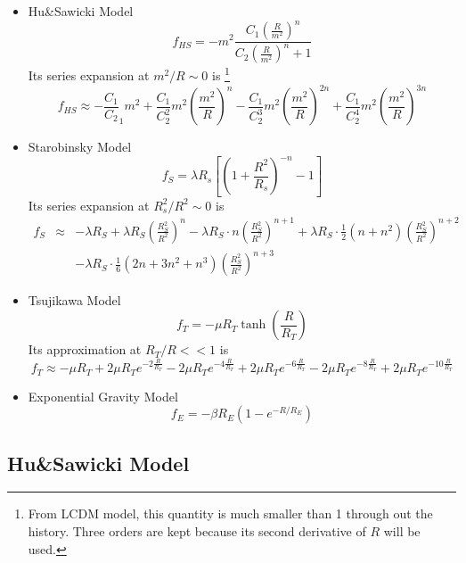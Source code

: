 \documentclass[12pt,a4paper]{article}
\begin{document}
\begin{itemize}
\item
Hu\&Sawicki Model
\begin{equation}
f_{HS}=-m^2\frac{C_1 (\frac{R}{m^2})^n}{C_2 (\frac{R}{m^2})^n + 1}\label{HSMod}
\end{equation}
Its series expansion at $m^2/R\sim 0$ is \footnote{From LCDM model, this quantity is much smaller than 1 through out the history. Three orders are kept because its second derivative of $R$ will be used.}
\begin{equation}
f_{HS}\approx -\frac{C_1}{C_2}_1m^2+\frac{C_1}{C_2^2}m^2(\frac{m^2}{R})^n-\frac{C_1}{C_2^3}m^2 (\frac{m^2}{R})^{2n}+\frac{C_1}{C_2^4}m^2(\frac{m^2}{R})^{3n}
\end{equation}
\item
Starobinsky Model
\begin{equation}
f_{S}=\lambda R_s[(1+\frac{R^2}{R_s})^{-n}-1] \label{SbMod}
\end{equation}
Its series expansion at $R_s^2/R^2\sim 0$ is 
\begin{eqnarray}
f_S &\approx& -\lambda R_S+\lambda R_S (\frac{R_S^2}{R^2})^n-\lambda R_S\cdot n (\frac{R_S^2}{R^2})^{n+1} +\lambda R_S\cdot\frac12 (n+n^2)(\frac{R_S^2}{R^2})^{n+2}\\
&&-\lambda R_S \cdot \frac16(2n+3n^2+n^3)(\frac{R_S^2}{R^2})^{n+3}
\end{eqnarray}
\item
Tsujikawa Model
\begin{equation}
f_T=-\mu R_T \tanh(\frac{R}{R_T})
\end{equation}
Its approximation at $R_T/R<<1$ is
\begin{equation}
f_T\approx -\mu R_T +2\mu R_T e^{-2\frac{R}{R_T}}-2\mu R_T e^{-4\frac{R}{R_T}}+2\mu R_T e^{-6\frac{R}{R_T}}-2\mu R_T e^{-8\frac{R}{R_T}}+2\mu R_T e^{-10\frac{R}{R_T}}
\end{equation}
\item
Exponential Gravity Model
\begin{equation}
f_E=-\beta R_E(1-e^{-R/R_E}) \label{TkMod}
\end{equation}
\end{itemize}


\subsection{Hu\&Sawicki Model}
\end{document}
